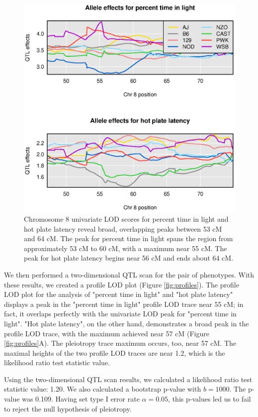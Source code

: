 \documentclass[12pt,twoside, lineno]{gsajnl}
\begin{document}
\begin{figure}
\includegraphics[width = \textwidth]{2018-11-19-coefs.eps}
\caption{Chromosome 8 univariate LOD scores for percent time in light and hot plate latency reveal broad, overlapping peaks between 53 cM and 64 cM. The peak for percent time in light spans the region from approximately 53 cM to 60 cM, with a maximum near 55 cM. The peak for hot plate latency begins near 56 cM and ends about 64 cM.}
\label{fig:chr8-effects}
\end{figure}




We then performed a two-dimensional QTL scan for the pair of phenotypes. With these results, we created a profile LOD plot (Figure \ref{fig:profiles}). The profile LOD plot for the analysis of "percent time in light" and "hot plate latency" displays a peak in the "percent time in light" profile LOD trace near 55 cM; in fact, it overlaps perfectly with the univariate LOD peak for "percent time in light". "Hot plate latency", on the other hand, demonstrates a broad peak in the profile LOD trace, with the maximum achieved near 57 cM (Figure \ref{fig:profiles}A). The pleiotropy trace maximum occurs, too, near 57 cM. The maximal heights of the two profile LOD traces are near 1.2, which is the likelihood ratio test statistic value.

Using the two-dimensional QTL scan results, we calculated a likelihood ratio test statistic value: 1.20. We also calculated a bootstrap p-value with $b = 1000$. The p-value was 0.109. Having set type I error rate $\alpha = 0.05$, this p-values led us to fail to reject the null hypothesis of pleiotropy. 
\end{document}
